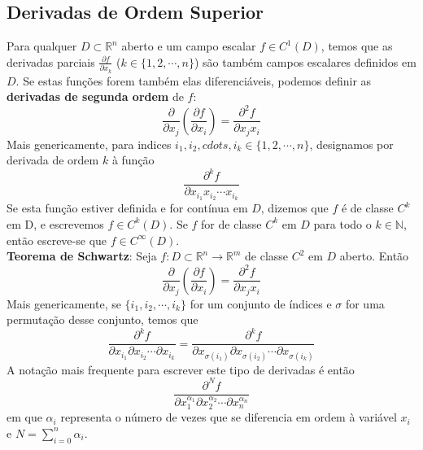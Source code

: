 \documentclass{article}
\begin{document}
\subsection{Derivadas de Ordem Superior}
Para qualquer $D \subset \mathbb{R}^n$ aberto e um campo escalar $f \in C^1(D)$, temos que as derivadas parciais $\frac{\partial f}{\partial x_k}$ ($k \in \{ 1, 2, \cdots, n \}$) são também campos escalares definidos em $D$. Se estas funções forem também elas diferenciáveis, podemos definir as \textbf{derivadas de segunda ordem} de $f$:
$$
\frac{\partial}{\partial x_j} \left( \frac{\partial f}{\partial x_i} \right) = \frac{\partial ^2 f}{\partial x_j x_i}
$$
Mais genericamente, para indices $i_1, i_2, cdots , i_k \in \{ 1, 2, \cdots , n \}$, designamos por derivada de ordem $k$ à função
$$
\frac{\partial ^k f}{\partial x_{i_1}x_{i_2} \cdots x_{i_k}}
$$
Se esta função estiver definida e for contínua em $D$, dizemos que $f$ é de classe $C^k$ em D, e escrevemos $f \in C^k(D)$. Se $f$ for de classe $C^k$ em $D$ para todo o $k \in \mathbb{N}$, então escreve-se que $f \in C ^\infty (D)$.\\

\textbf{Teorema de Schwartz}: Seja $f: D \subset \mathbb{R}^n \to \mathbb{R}^m$ de classe $C^2$ em $D$ aberto. Então
$$
\frac{\partial}{\partial x_j} \left( \frac{\partial f}{\partial x_i} \right) = \frac{\partial ^2 f}{\partial x_j x_i}
$$
Mais genericamente, se $\{ i_1, i_2, \cdots, i_k \}$ for um conjunto de índices e $\sigma$ for uma permutação desse conjunto, temos que
$$
\frac{\partial ^k f}{\partial x_{i_1} \partial x_{i_2} \cdots \partial x_{i_k}} = \frac{\partial ^k f}{\partial x_{\sigma(i_1)} \partial x_{\sigma(i_2)} \cdots \partial x_{\sigma(i_k)}}
$$
A notação mais frequente para escrever este tipo de derivadas é então
$$
\frac{\partial ^N f}{\partial x_1^{\alpha_1} \partial x_2^{\alpha_2} \cdots \partial x_n ^{\alpha_n}}
$$
em que $\alpha_i$ representa o número de vezes que se diferencia em ordem à variável $x_i$ e $N = \sum_{i=0}^n \alpha_i$.
\end{document}
